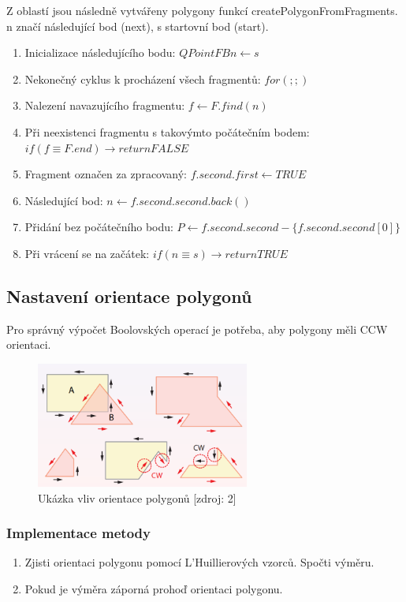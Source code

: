 \documentclass[a4paper, 12pt]{article}
\begin{document}
Z oblastí jsou následně vytvářeny polygony funkcí createPolygonFromFragments. n značí následující bod (next), s startovní bod (start). 

\begin{enumerate}
\item Inicializace následujícího bodu: $QPointFB n \leftarrow s$
\item Nekonečný cyklus k procházení všech fragmentů: $for(;;)$
\item Nalezení navazujícího fragmentu: $f \leftarrow F.find(n)$
\item Při neexistenci fragmentu s takovýmto počátečním bodem: $if(f \equiv F.end) \rightarrow return FALSE$
\item Fragment označen za zpracovaný: $f.second.first \leftarrow TRUE$
\item Následující bod: $n \leftarrow f.second.second.back()$
\item Přidání bez počátečního bodu: $P \leftarrow f.second.second - \{ f.second.second[0]\} $
\item Při vrácení se na začátek: $if (n \equiv s) \rightarrow return TRUE$
\end{enumerate}

\subsection{Nastavení orientace polygonů}
Pro správný výpočet Boolovských operací je potřeba, aby polygony měli CCW orientaci.

\begin{figure}[h!]
	\centering
	\includegraphics[width=7cm]{pictures/orientace.png}
	\caption{Ukázka vliv orientace polygonů [zdroj: 2]}
\end{figure}

\subsubsection{Implementace metody}
\begin{enumerate}
\item Zjisti orientaci polygonu pomocí L'Huillierových vzorců.
\subsubitem Spočti výměru.
\item Pokud je výměra záporná prohoď orientaci polygonu.

\end{enumerate}
\end{document}
